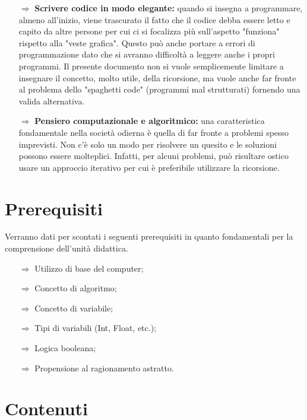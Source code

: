 \begin{itemize}
    \item [$\Rightarrow$] \textbf{Scrivere codice in modo elegante:} quando si insegna
    a programmare, almeno all'inizio, viene trascurato il fatto che il codice debba essere
    letto e capito da altre persone per cui ci si focalizza più sull'aspetto "funziona" rispetto
    alla "veste grafica". Questo può anche portare a errori di programmazione dato che si avranno
    difficoltà a leggere anche i propri programmi. Il presente documento non si vuole semplicemente
    limitare a insegnare il concetto, molto utile, della ricorsione, ma vuole anche far fronte al
    problema dello "spaghetti code" (programmi mal strutturati) fornendo una valida alternativa.
    \item [$\Rightarrow$] \textbf{Pensiero computazionale e algoritmico:} una caratteristica fondamentale
    nella società odierna è quella di far fronte a problemi spesso imprevisti. Non c'è solo un modo per
    risolvere un quesito e le soluzioni possono essere molteplici. Infatti, per alcuni problemi, può
    risultare ostico usare un approccio iterativo per cui è preferibile utilizzare la ricorsione.
\end{itemize}

\section{Prerequisiti}

Verranno dati per scontati i seguenti prerequisiti in quanto fondamentali per la comprensione dell'unità didattica.

\begin{itemize}
    \item [$\Rightarrow$] Utilizzo di base del computer;
    \item [$\Rightarrow$] Concetto di algoritmo;
    \item [$\Rightarrow$] Concetto di variabile;
    \item [$\Rightarrow$] Tipi di variabili (Int, Float, etc.);
    \item [$\Rightarrow$] Logica booleana;
    \item [$\Rightarrow$] Propensione al ragionamento astratto.
\end{itemize}

\section{Contenuti}


